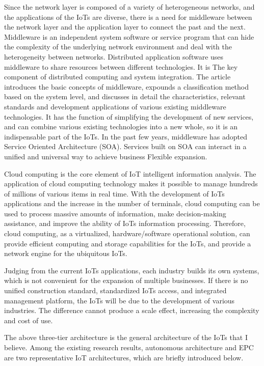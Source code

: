 \documentclass[a4paper,11pt]{article}
\begin{document}
Since the network layer is composed of a variety of heterogeneous networks, and the applications of the IoTs are diverse, there is a need for middleware between the network layer and the application layer to connect the past and the next. Middleware is an independent system software or service program that can hide the complexity of the underlying network environment and deal with the heterogeneity between networks. Distributed application software uses middleware to share resources between different technologies. It is The key component of distributed computing and system integration\cite{1}. The article introduces the basic concepts of middleware, expounds a classification method based on the system level, and discusses in detail the characteristics, relevant standards and development applications of various existing middleware technologies. It has the function of simplifying the development of new services, and can combine various existing technologies into a new whole, so it is an indispensable part of the IoTs. In the past few years, middleware has adopted Service Oriented Architecture (SOA)\cite{3}. Services built on SOA can interact in a unified and universal way to achieve business Flexible expansion.

Cloud computing is the core element of IoT intelligent information analysis. The application of cloud computing technology makes it possible to manage hundreds of millions of various items in real time. With the development of IoTs applications and the increase in the number of terminals, cloud computing can be used to process massive amounts of information, make decision-making assistance, and improve the ability of IoTs information processing. Therefore, cloud computing, as a virtualized, hardware/software operational solution, can provide efficient computing and storage capabilities for the IoTs, and provide a network engine for the ubiquitous IoTs.

Judging from the current IoTs applications, each industry builds its own systems, which is not convenient for the expansion of multiple businesses. If there is no unified construction standard, standardized IoTs access, and integrated management platform, the IoTs will be due to the development of various industries. The difference cannot produce a scale effect, increasing the complexity and cost of use.

The above three-tier architecture is the general architecture of the IoTs that I believe. Among the existing research results, autonomous architecture\cite{2} and EPC \cite{4} are two representative IoT architectures, which are briefly introduced below.
\end{document}
